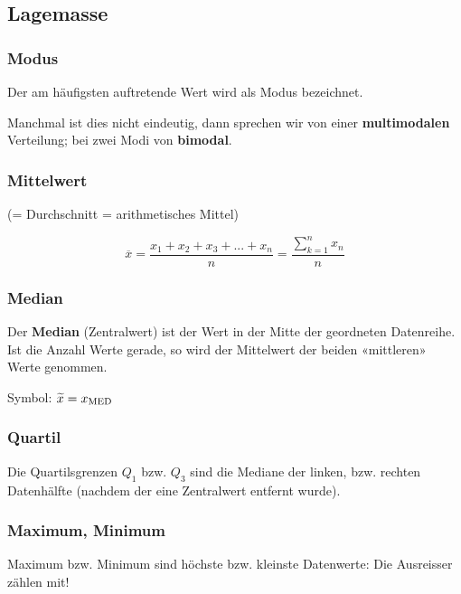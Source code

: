 \begin{multicols}{2}

\subsection*{Lagemasse}


\subsubsection*{Modus}
Der am häufigsten auftretende Wert wird als Modus bezeichnet.

Manchmal ist dies nicht eindeutig, dann sprechen wir von einer
\textbf{multimodalen} Verteilung; bei zwei Modi von \textbf{bimodal}.


\subsubsection*{Mittelwert}
(= Durchschnitt = arithmetisches Mittel)

$$\overline{x} = \frac{x_1 + x_2 + x_3 + ... +
x_n}{n}=  \frac{\sum\limits_{k=1}^nx_n}n$$

\subsubsection*{Median}


Der \textbf{Median} (Zentralwert) ist der Wert in der Mitte der geordneten Datenreihe. Ist
die Anzahl Werte gerade, so wird der Mittelwert der beiden
«mittleren» Werte genommen.

Symbol: $\widetilde{x} = x_{\textrm{MED}}$


\subsubsection*{Quartil}

Die Quartilsgrenzen $Q_1$ bzw. $Q_3$ sind die Mediane der linken,
bzw. rechten Datenhälfte (nachdem der eine Zentralwert entfernt
wurde).

\subsubsection*{Maximum, Minimum}

Maximum bzw. Minimum sind höchste bzw. kleinste Datenwerte: Die Ausreisser
zählen mit!

\RLP{\forceCB}%
\keinHeaderUndKeinFooter{}



\end{multicols}
